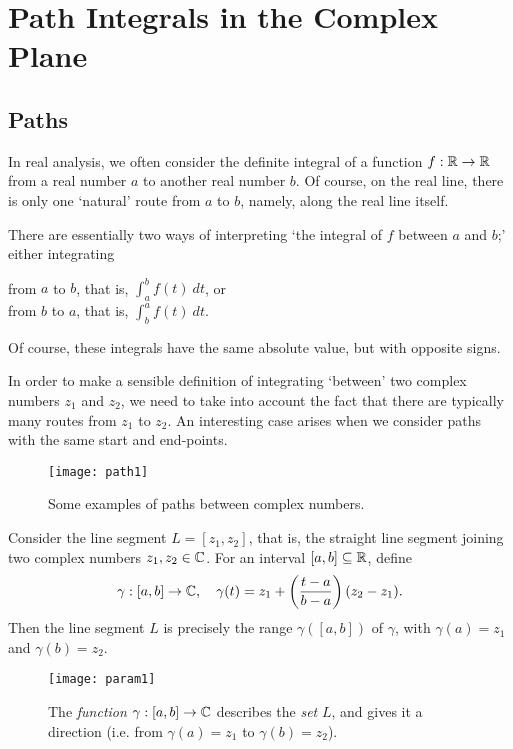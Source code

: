 
\chapter{Path Integrals in the Complex Plane}
\section{Paths}

In real analysis, we often consider the definite integral of a function $f: \mathbb{R} \to \mathbb{R}$ from a real number $a$ to another real number $b$.  Of course, on the real line, there is only one `natural' route from $a$ to $b$, namely, along the real line itself.

  There are essentially two ways of interpreting `the integral of $f$ between $a$ and $b$;' either integrating
\begin{center}
from $a$ to $b$, that is, $\int_a^b f(t) \ dt$, or \\
from $b$ to $a$, that is, $\int_b^a f(t)\ dt$.
\end{center}
Of course, these integrals have the same absolute value, but with opposite signs.


In order to make a sensible definition of integrating `between' two complex numbers $z_1$ and $z_2$, we need to take into account the fact that there are typically many routes from $z_1$ to $z_2$.  An interesting case arises when we consider paths with the same start and end-points.

\begin{figure}[h]
\centering
\texttt{[image: path1]}
\caption{Some examples of paths between complex numbers.}
\end{figure}

\begin{example}
\label{e:path1}
Consider the line segment $L=[z_1,z_2]$, that is, the straight line segment joining two complex numbers $z_1,z_2 \in \mathbb{C}$.  For an interval $[a,b] \subseteq \mathbb{R}$, define
\[
\gamma : [a,b] \to \mathbb{C}, \quad \gamma (t) = z_1 + \left( \frac{t-a}{b-a} \right) ( z_2 - z_1 ).
\]
Then the line segment $L$ is precisely the range $\gamma \left( [a,b] \right)$ of $\gamma$, with $\gamma (a) = z_1$ and $\gamma (b) = z_2$.

\end{example}

\begin{figure}[h]
\centering
\texttt{[image: param1]}
\caption{The \emph{function} $\gamma:[a,b] \to \mathbb{C}$ describes the \emph{set} $L$, and gives it a direction (i.e. from $\gamma(a)=z_1$ to $\gamma (b)=z_2$).}
\end{figure}

